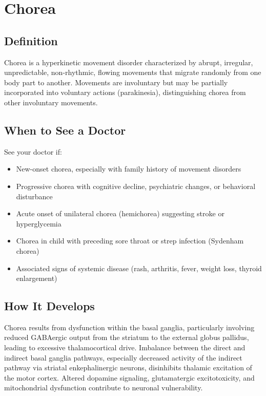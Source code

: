 \chapter{Chorea}

\section*{Definition}
Chorea is a hyperkinetic movement disorder characterized by abrupt, irregular, unpredictable, non-rhythmic, flowing movements that migrate randomly from one body part to another. Movements are involuntary but may be partially incorporated into voluntary actions (parakinesia), distinguishing chorea from other involuntary movements.

\section*{When to See a Doctor}
See your doctor if:
\begin{itemize}
  \item New-onset chorea, especially with family history of movement disorders
  \item Progressive chorea with cognitive decline, psychiatric changes, or behavioral disturbance
  \item Acute onset of unilateral chorea (hemichorea) suggesting stroke or hyperglycemia
  \item Chorea in child with preceding sore throat or strep infection (Sydenham chorea)
  \item Associated signs of systemic disease (rash, arthritis, fever, weight loss, thyroid enlargement)
\end{itemize}

\section*{How It Develops}
Chorea results from dysfunction within the basal ganglia, particularly involving reduced GABAergic output from the striatum to the external globus pallidus, leading to excessive thalamocortical drive. Imbalance between the direct and indirect basal ganglia pathways, especially decreased activity of the indirect pathway via striatal enkephalinergic neurons, disinhibits thalamic excitation of the motor cortex. Altered dopamine signaling, glutamatergic excitotoxicity, and mitochondrial dysfunction contribute to neuronal vulnerability.

